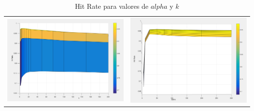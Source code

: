 \begin{table}[h!]
\begin{center}
\begin{tabular}{c c}
	\includegraphics[scale=0.3]{exp2/PCA-HitRate-1.png} &
	\includegraphics[scale=0.3]{exp2/PCA-HitRate-2.png}\\
\end{tabular}
\end{center}
\caption{Hit Rate para valores de $alpha$ y $k$}
\end{table}

